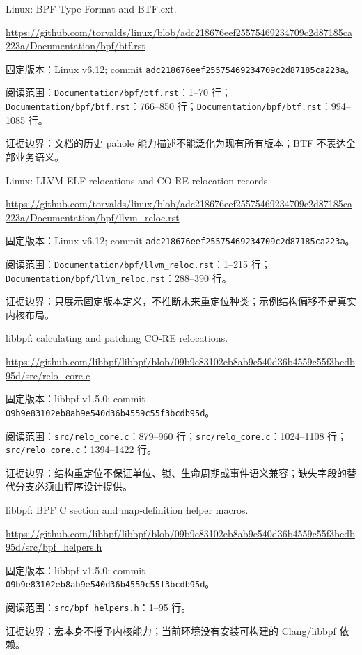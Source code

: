 \documentclass[UTF8,fontset=fandol,openany,11pt]{ctexbook}
\begin{document}
\begin{thebibliography}{999}
 Linux: BPF Type Format and BTF.ext.\par
\url{https://github.com/torvalds/linux/blob/adc218676eef25575469234709c2d87185ca223a/Documentation/bpf/btf.rst}\par
{\small\raggedright 固定版本：Linux v6.12; commit \texttt{adc21867\allowbreak{}6eef2557\allowbreak{}54692347\allowbreak{}09c2d871\allowbreak{}85ca223a}。\par
阅读范围：\nolinkurl{Documentation/bpf/btf.rst}：1–70 行；\nolinkurl{Documentation/bpf/btf.rst}：766–850 行；\nolinkurl{Documentation/bpf/btf.rst}：994–1085 行。\par
证据边界：文档的历史 pahole 能力描述不能泛化为现有所有版本；BTF 不表达全部业务语义。
}

 Linux: LLVM ELF relocations and CO-RE relocation records.\par
\url{https://github.com/torvalds/linux/blob/adc218676eef25575469234709c2d87185ca223a/Documentation/bpf/llvm_reloc.rst}\par
{\small\raggedright 固定版本：Linux v6.12; commit \texttt{adc21867\allowbreak{}6eef2557\allowbreak{}54692347\allowbreak{}09c2d871\allowbreak{}85ca223a}。\par
阅读范围：\nolinkurl{Documentation/bpf/llvm_reloc.rst}：1–215 行；\nolinkurl{Documentation/bpf/llvm_reloc.rst}：288–390 行。\par
证据边界：只展示固定版本定义，不推断未来重定位种类；示例结构偏移不是真实内核布局。
}

 libbpf: calculating and patching CO-RE relocations.\par
\url{https://github.com/libbpf/libbpf/blob/09b9e83102eb8ab9e540d36b4559c55f3bcdb95d/src/relo_core.c}\par
{\small\raggedright 固定版本：libbpf v1.5.0; commit \texttt{09b9e831\allowbreak{}02eb8ab9\allowbreak{}e540d36b\allowbreak{}4559c55f\allowbreak{}3bcdb95d}。\par
阅读范围：\nolinkurl{src/relo_core.c}：879–960 行；\nolinkurl{src/relo_core.c}：1024–1108 行；\nolinkurl{src/relo_core.c}：1394–1422 行。\par
证据边界：结构重定位不保证单位、锁、生命周期或事件语义兼容；缺失字段的替代分支必须由程序设计提供。
}

 libbpf: BPF C section and map-definition helper macros.\par
\url{https://github.com/libbpf/libbpf/blob/09b9e83102eb8ab9e540d36b4559c55f3bcdb95d/src/bpf_helpers.h}\par
{\small\raggedright 固定版本：libbpf v1.5.0; commit \texttt{09b9e831\allowbreak{}02eb8ab9\allowbreak{}e540d36b\allowbreak{}4559c55f\allowbreak{}3bcdb95d}。\par
阅读范围：\nolinkurl{src/bpf_helpers.h}：1–95 行。\par
证据边界：宏本身不授予内核能力；当前环境没有安装可构建的 Clang/libbpf 依赖。
}


\end{thebibliography}
\end{document}
